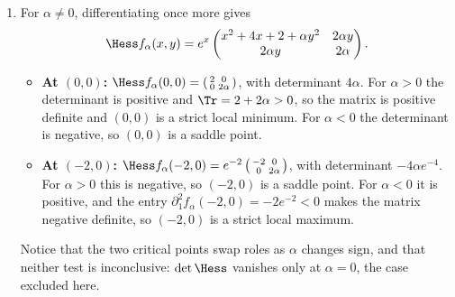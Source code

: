 \begin{exercisesolution}
\begin{enumerate}[label=\textbf{(\alph*)}]
  \item For $\alpha \neq 0$, differentiating once more gives
\[\Hess f_\alpha(x,y) = e^x \begin{pmatrix} x^2+4x+2+\alpha y^2 & 2\alpha y \\ 2\alpha y & 2\alpha \end{pmatrix}.\]
\begin{itemize}
  \item \textbf{At $(0,0)$:} $\Hess f_\alpha(0,0) = \left(\begin{smallmatrix} 2 & 0 \\ 0 & 2\alpha \end{smallmatrix}\right)$, with determinant $4\alpha$. For $\alpha > 0$ the determinant is positive and $\Tr = 2+2\alpha > 0$, so the matrix is positive definite and $(0,0)$ is a strict local minimum. For $\alpha < 0$ the determinant is negative, so $(0,0)$ is a saddle point.
  \item \textbf{At $(-2,0)$:} $\Hess f_\alpha(-2,0) = e^{-2}\left(\begin{smallmatrix} -2 & 0 \\ 0 & 2\alpha \end{smallmatrix}\right)$, with determinant $-4\alpha e^{-4}$. For $\alpha > 0$ this is negative, so $(-2,0)$ is a saddle point. For $\alpha < 0$ it is positive, and the entry $\partial_1^2 f_\alpha(-2,0) = -2e^{-2} < 0$ makes the matrix negative definite, so $(-2,0)$ is a strict local maximum.
\end{itemize}
Notice that the two critical points swap roles as $\alpha$ changes sign, and that neither test is
inconclusive: $\det \Hess$ vanishes only at $\alpha = 0$, the case excluded here.


\end{enumerate}
\end{exercisesolution}

